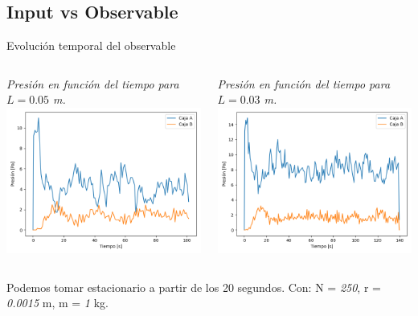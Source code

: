 \documentclass{beamer}
\begin{document}
\subsection{Input vs Observable}
\begin{frame}{Evolución temporal del observable}
  \begin{columns}
    \begin{column}{0.5\textwidth}
      \scriptsize \textit{Presión en función del tiempo para $L = 0.05$ m.}
      \includegraphics[width=\linewidth]{photoMaterial/pvt_05.png}
    \end{column}
    \begin{column}{0.5\textwidth}
      \scriptsize \textit{Presión en función del tiempo para $L = 0.03$ m.}
      \includegraphics[width=\linewidth]{photoMaterial/pvt_03.png}
    \end{column}
  \end{columns}
  \tiny Podemos tomar estacionario a partir de los 20 segundos.
  \tiny Con: N = \textit{250}, r = \textit{0.0015} m, m = \textit{1} kg.
\end{frame}
\end{document}
